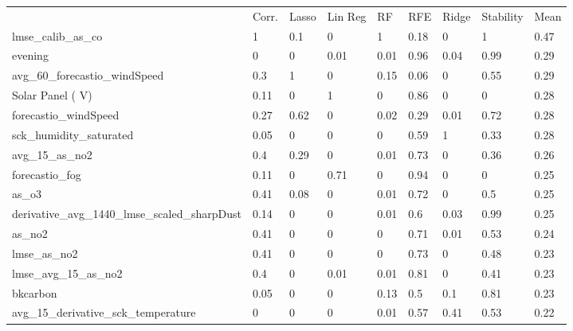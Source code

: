 \begin{table}
\centering
\small
\begin{tabular}{lllllllll}
\\
\\
\toprule
     & Corr. & Lasso & Lin Reg & RF   & RFE  & Ridge & Stability & Mean \\
\midrule
lmse\_calib\_as\_co                            & 1     & 0.1   & 0          & 1    & 0.18 & 0     & 1         & 0.47 \\
evening                                        & 0     & 0     & 0.01       & 0.01 & 0.96 & 0.04  & 0.99      & 0.29 \\
avg\_60\_forecastio\_windSpeed                 & 0.3   & 1     & 0          & 0.15 & 0.06 & 0     & 0.55      & 0.29 \\
Solar Panel ( V)                               & 0.11  & 0     & 1          & 0    & 0.86 & 0     & 0         & 0.28 \\
forecastio\_windSpeed                          & 0.27  & 0.62  & 0          & 0.02 & 0.29 & 0.01  & 0.72      & 0.28 \\
sck\_humidity\_saturated                       & 0.05  & 0     & 0          & 0    & 0.59 & 1     & 0.33      & 0.28 \\
avg\_15\_as\_no2                               & 0.4   & 0.29  & 0          & 0.01 & 0.73 & 0     & 0.36      & 0.26 \\
forecastio\_fog                                & 0.11  & 0     & 0.71       & 0    & 0.94 & 0     & 0         & 0.25 \\
as\_o3                                         & 0.41  & 0.08  & 0          & 0.01 & 0.72 & 0     & 0.5       & 0.25 \\
derivative\_avg\_1440\_lmse\_scaled\_sharpDust & 0.14  & 0     & 0          & 0.01 & 0.6  & 0.03  & 0.99      & 0.25 \\
as\_no2                                        & 0.41  & 0     & 0          & 0    & 0.71 & 0.01  & 0.53      & 0.24 \\
lmse\_as\_no2                                  & 0.41  & 0     & 0          & 0    & 0.73 & 0     & 0.48      & 0.23 \\
lmse\_avg\_15\_as\_no2                         & 0.4   & 0     & 0.01       & 0.01 & 0.81 & 0     & 0.41      & 0.23 \\
bkcarbon                                       & 0.05  & 0     & 0          & 0.13 & 0.5  & 0.1   & 0.81      & 0.23 \\
avg\_15\_derivative\_sck\_temperature          & 0     & 0     & 0          & 0.01 & 0.57 & 0.41  & 0.53      & 0.22 \\

\end{tabular}
\end{table}
